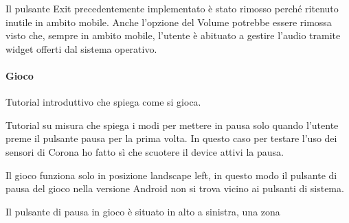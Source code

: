 		Il pulsante Exit precedentemente implementato è stato rimosso perché ritenuto inutile in ambito mobile. Anche l'opzione del Volume potrebbe essere rimossa visto che, sempre in ambito mobile, l'utente è abituato a gestire l'audio tramite widget offerti dal sistema operativo.
		
		\paragraph{Gioco}
		Tutorial introduttivo che spiega come si gioca.
		
		Tutorial su misura che spiega i modi per mettere in pausa solo quando l'utente preme il pulsante pausa per la prima volta. In questo caso per testare l'uso dei sensori di Corona ho fatto sì che scuotere il device attivi la pausa.
		
		Il gioco funziona solo in posizione landscape left, in questo modo il pulsante di pausa del gioco nella versione Android non si trova vicino ai pulsanti di sistema.
		
		Il pulsante di pausa in gioco è situato in alto a sinistra, una zona
		
		
